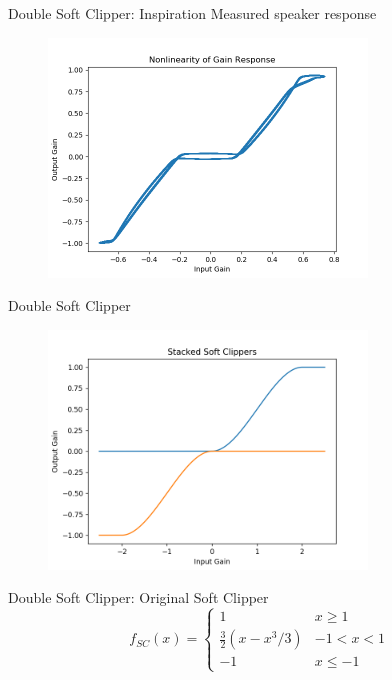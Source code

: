 \begin{frame}
\end{frame}

\begin{frame}{Double Soft Clipper: Inspiration}
    Measured speaker response
    \begin{figure}
        \centering
        \includegraphics[height=2.5in]{../DoubleSoftClipper/Gain_Nonlinearity.png}
    \end{figure}
\end{frame}

\begin{frame}{Double Soft Clipper}
    \begin{figure}
        \centering
        \includegraphics[height=2.5in]{../DoubleSoftClipper/Pics/stacked.png}
    \end{figure}
\end{frame}

\begin{frame}{Double Soft Clipper: Original Soft Clipper}
    \begin{equation}
        f_{SC}(x) = \begin{cases} 1 & x \geq 1 \\ \frac{3}{2} (x - x^3/3) & -1 < x < 1 \\ -1 & x \leq -1 \end{cases}
    \end{equation}
\end{frame}

